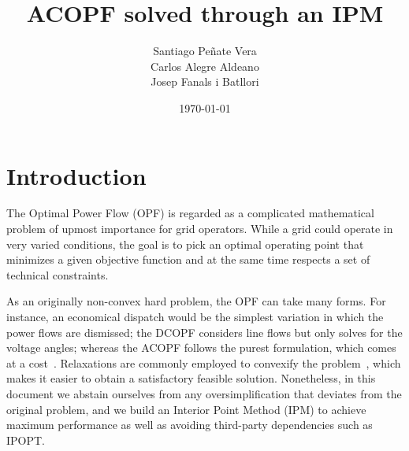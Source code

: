 \documentclass{article}
\title{ACOPF solved through an IPM}
\author{Santiago Peñate Vera \\ Carlos Alegre Aldeano \\ Josep Fanals i Batllori}
\date{\today}
\begin{document}
\maketitle

\section{Introduction}

The Optimal Power Flow (OPF) is regarded as a complicated mathematical problem of upmost importance for grid operators. While a grid could operate in very varied conditions, the goal is to pick an optimal operating point that minimizes a given objective function and at the same time respects a set of technical constraints.

As an originally non-convex hard problem, the OPF can take many forms. For instance, an economical dispatch would be the simplest variation in which the power flows are dismissed; the DCOPF considers line flows but only solves for the voltage angles; whereas the ACOPF follows the purest formulation, which comes at a cost~\cite{chatzivasileiadis2018optimization}. Relaxations are commonly employed to convexify the problem~\cite{ergun2019optimal}, which makes it easier to obtain a satisfactory feasible solution. Nonetheless, in this document we abstain ourselves from any oversimplification that deviates from the original problem, and we build an Interior Point Method (IPM) to achieve maximum performance as well as avoiding third-party dependencies such as IPOPT.
\end{document}
